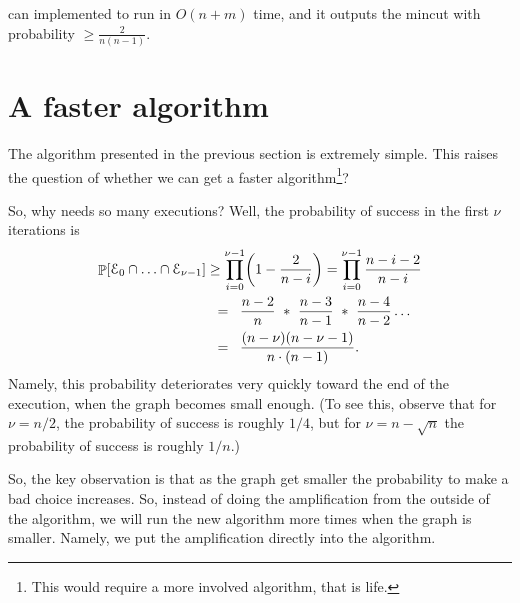 \begin{lemma}
    \MinCut{} can implemented to run in $O(n + m)$ time, and it
    outputs the mincut with probability
    $\displaystyle \geq \frac{2}{n ( n-1 ) }$.
\end{lemma}



\section{A faster algorithm}

The algorithm presented in the previous section is extremely simple.
This raises the question of whether we can get a faster
algorithm\footnote{This would require a more involved algorithm, that is
   life.}?

So, why \MinCutRep{} needs so many executions? Well, the probability
of success in the first $\nu$ iterations is
\begin{align}
  \Prob{\Event_{0}\cap\ldots\cap\Event_{\nu-1}}
  &\geq 
    \prod_{i=0}^{\nu-1}\pth{1-\frac{2}{n-i}}
    =  \prod_{i=0}^{\nu-1}\frac{n-i-2}{n-i}
    \nonumber\\&%
    \EQ%
    \frac{n-2}{n}\ *\ \frac{n-3}{n-1}\ *\ \frac{n-4}{n-2}\ldots
    \\&%
    \EQ%
    \frac{(n-\nu)(n-\nu-1)}{n\cdot(n-1)}.  \eqlab{first}
\end{align}
Namely, this probability deteriorates very quickly toward the end of
the execution, when the graph becomes small enough. (To see this,
observe that for $\nu=n/2$, the probability of success is roughly
$1/4$, but for $\nu=n-\sqrt{n}$ the probability of success is roughly
$1/n$.)


So, the key observation is that as the graph get smaller the
probability to make a bad choice increases.  So, instead of doing the
amplification from the outside of the algorithm, we will run the new
algorithm more times when the graph is smaller. Namely, we put the
amplification directly into the algorithm.


